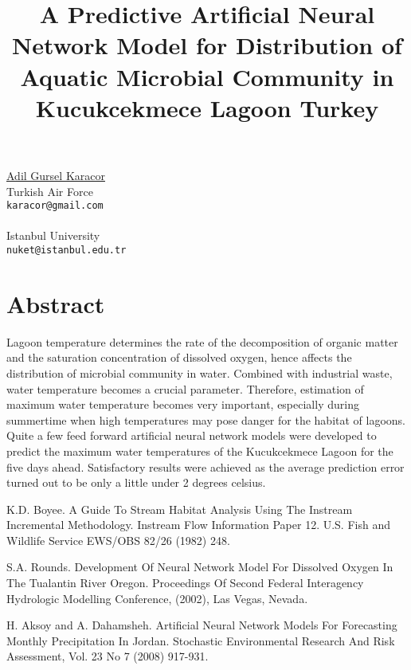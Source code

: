 \title{A Predictive Artificial Neural Network Model for Distribution of Aquatic Microbial Community in Kucukcekmece Lagoon Turkey}
\author{} \institute{}
\maketitle
\begin{center}
{\large \underline{Adil Gursel Karacor}}\\
Turkish Air Force\\
{\tt karacor@gmail.com}
\\ \vspace{4mm}{\large Nuket Sivri}\\
Istanbul University\\
{\tt nuket@istanbul.edu.tr}

\end{center}

\section*{Abstract}

Lagoon temperature determines the rate of the decomposition of organic matter and the saturation concentration of dissolved oxygen, hence affects the distribution of microbial community in water. Combined with industrial waste, water temperature becomes a crucial parameter. Therefore, estimation of maximum water temperature becomes very important, especially during summertime when high temperatures may pose danger for the habitat of lagoons. Quite a few feed forward artificial neural network models were developed to predict the maximum water temperatures of the Kucukcekmece Lagoon for the five days ahead. Satisfactory results were achieved as the average prediction error turned out to be only a little under 2 degrees celsius.


\begin{thebibliography}{10}

{\sc K.D. Boyee}. {A Guide To Stream Habitat Analysis Using The Instream Incremental Methodology}. Instream Flow Information Paper 12. U.S. Fish and Wildlife Service EWS/OBS 82/26 (1982) 248.



{\sc S.A. Rounds}. {Development Of Neural Network Model For Dissolved Oxygen In The Tualantin River Oregon}. Proceedings Of Second Federal Interagency Hydrologic Modelling Conference, (2002), Las Vegas, Nevada.



{\sc H. Aksoy and A. Dahamsheh}. {Artificial Neural Network Models For Forecasting Monthly Precipitation In Jordan}. Stochastic Environmental Research And Risk Assessment, Vol. 23 No 7 (2008) 917-931.

\end{thebibliography}
